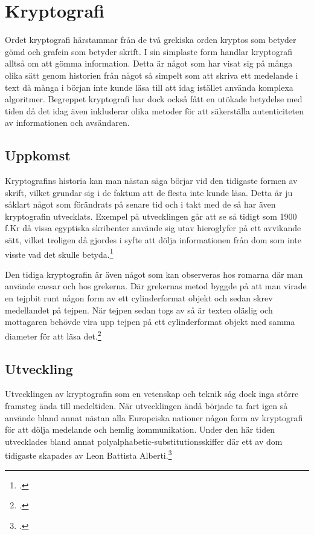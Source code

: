 
\section{Kryptografi} %
Ordet kryptografi härstammar från de två grekiska orden
kryptos som betyder gömd och grafein som betyder skrift.
I sin simplaste form handlar kryptografi alltså om att
gömma information. Detta är något som har visat sig på många
olika sätt genom historien från något så simpelt som att skriva
ett medelande i text då många i början inte kunde läsa till
att idag istället använda komplexa algoritmer.
Begreppet kryptografi har dock också fått en utökade betydelse
med tiden då det idag även inkluderar olika metoder för att
säkerställa autenticiteten av informationen och avsändaren.

\subsection{Uppkomst} %
Kryptografins historia kan man nästan säga börjar vid den
tidigaste formen av skrift, vilket grundar sig i de faktum att
de flesta inte kunde läsa. Detta är ju såklart något som förändrats
på senare tid och i takt med de så har även kryptografin utvecklats.
Exempel på utvecklingen går att se så tidigt som 1900 f.Kr då vissa egyptiska
skribenter använde sig utav hieroglyfer på ett avvikande sätt, vilket
troligen då gjordes i syfte att dölja informationen från dom som inte
visste vad det skulle betyda.\footcite{kryptografi-historia-1}

Den tidiga kryptografin är även något som kan observeras hos romarna där
man använde \gls{caesar} och hos grekerna. Där grekernas metod byggde på
att man virade en tejpbit runt någon form av ett cylinderformat objekt
och sedan skrev medellandet på tejpen. När tejpen sedan togs av så är texten %
oläslig och mottagaren behövde vira upp tejpen på ett cylinderformat objekt
med samma diameter för att läsa det.\footcite{kryptografi-historia-1}

\subsection{Utveckling} %
Utvecklingen av kryptografin som en vetenskap och teknik såg dock inga större framsteg
ända till medeltiden. När utvecklingen ändå började ta fart igen så använde bland annat
nästan alla Europeiska nationer någon form av kryptografi för att dölja medelande och hemlig kommunikation.
Under den här tiden utvecklades bland annat \gls{polyalphabetic-substitutionsskiffer} där ett av dom tidigaste skapades av
Leon Battista Alberti.\footcite{kryptografi-historia-1}

